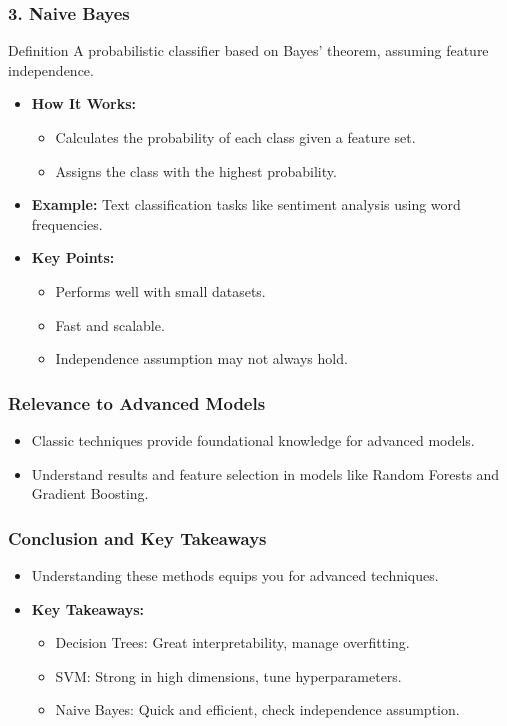 \documentclass[aspectratio=169]{beamer}
\begin{document}
\begin{frame}[fragile]
    \frametitle{3. Naive Bayes}
    \begin{block}{Definition}
        A probabilistic classifier based on Bayes' theorem, assuming feature independence.
    \end{block}

    \begin{itemize}
        \item \textbf{How It Works:}
        \begin{itemize}
            \item Calculates the probability of each class given a feature set.
            \item Assigns the class with the highest probability.
        \end{itemize}
        
        \item \textbf{Example:}
        Text classification tasks like sentiment analysis using word frequencies.

        \item \textbf{Key Points:}
        \begin{itemize}
            \item Performs well with small datasets.
            \item Fast and scalable.
            \item Independence assumption may not always hold.
        \end{itemize}
    \end{itemize}
\end{frame}

\begin{frame}[fragile]
    \frametitle{Relevance to Advanced Models}
    \begin{itemize}
        \item Classic techniques provide foundational knowledge for advanced models.
        \item Understand results and feature selection in models like Random Forests and Gradient Boosting.
    \end{itemize}
\end{frame}

\begin{frame}[fragile]
    \frametitle{Conclusion and Key Takeaways}
    \begin{itemize}
        \item Understanding these methods equips you for advanced techniques.
        \item \textbf{Key Takeaways:}
        \begin{itemize}
            \item Decision Trees: Great interpretability, manage overfitting.
            \item SVM: Strong in high dimensions, tune hyperparameters.
            \item Naive Bayes: Quick and efficient, check independence assumption.
        \end{itemize}
    \end{itemize}
\end{frame}
\end{document}

